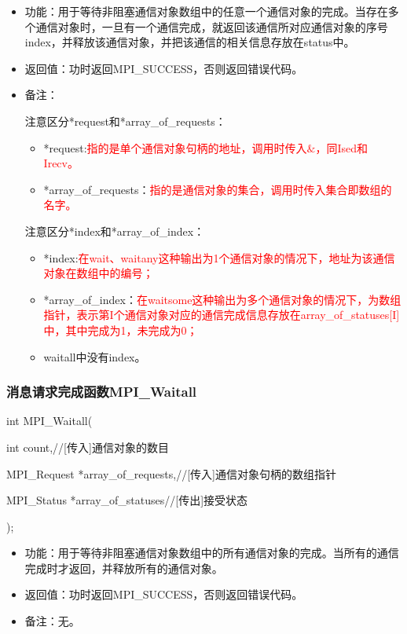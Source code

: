 \documentclass[UTF8]{article}%
\begin{document}
\begin{itemize}
    \item 功能：用于等待非阻塞通信对象数组中的任意一个通信对象的完成。当存在多个通信对象时，一旦有一个通信完成，就返回该通信所对应通信对象的序号index，并释放该通信对象，并把该通信的相关信息存放在status中。
    \item 返回值：功时返回MPI\_SUCCESS，否则返回错误代码。
    \item 备注：
    
    注意区分*request和*array\_of\_requests：

    {
        \begin{itemize}
            \item *request:\textcolor{red}{指的是单个通信对象句柄的地址，调用时传入$\&$，同Ised和Irecv。}
            \item *array\_of\_requests：\textcolor{red}{指的是通信对象的集合，调用时传入集合即数组的名字。}
        \end{itemize}
    }

    注意区分*index和*array\_of\_index：
    
    {
        \begin{itemize}
            \item *index:\textcolor{red}{在wait、waitany这种输出为1个通信对象的情况下，地址为该通信对象在数组中的编号；}
            \item *array\_of\_index：\textcolor{red}{在waitsome这种输出为多个通信对象的情况下，为数组指针，表示第I个通信对象对应的通信完成信息存放在array\_of\_statuses[I]中，其中完成为1，未完成为0；}
            \item waitall中没有index。
        \end{itemize}
    }

\end{itemize}

\subsubsection{消息请求完成函数MPI\_Waitall}

int MPI\_Waitall(

    \qquad int         count,//[传入]通信对象的数目

    \qquad MPI\_Request *array\_of\_requests,//[传入]通信对象句柄的数组指针

    \qquad MPI\_Status  *array\_of\_statuses//[传出]接受状态

);

\begin{itemize}
    \item 功能：用于等待非阻塞通信对象数组中的所有通信对象的完成。当所有的通信完成时才返回，并释放所有的通信对象。
    \item 返回值：功时返回MPI\_SUCCESS，否则返回错误代码。
    \item 备注：无。
\end{itemize}
\end{document}
